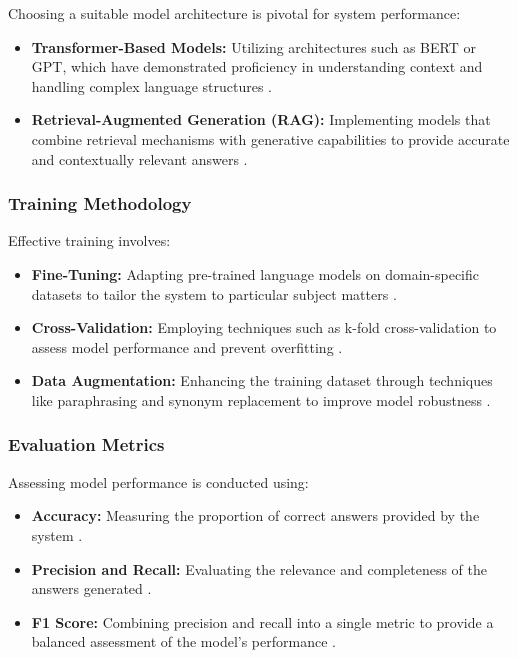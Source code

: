 \documentclass[sigconf]{acmart}
\begin{document}
Choosing a suitable model architecture is pivotal for system performance:

\begin{itemize}
    \item \textbf{Transformer-Based Models:} Utilizing architectures such as BERT or GPT, which have demonstrated proficiency in understanding context and handling complex language structures \cite{turn0search9}.
    \item \textbf{Retrieval-Augmented Generation (RAG):} Implementing models that combine retrieval mechanisms with generative capabilities to provide accurate and contextually relevant answers \cite{turn0search11}.
\end{itemize}

\subsubsection{Training Methodology}

Effective training involves:

\begin{itemize}
    \item \textbf{Fine-Tuning:} Adapting pre-trained language models on domain-specific datasets to tailor the system to particular subject matters \cite{turn0search7}.
    \item \textbf{Cross-Validation:} Employing techniques such as k-fold cross-validation to assess model performance and prevent overfitting \cite{turn0search6}.
    \item \textbf{Data Augmentation:} Enhancing the training dataset through techniques like paraphrasing and synonym replacement to improve model robustness \cite{turn0search0}.
\end{itemize}

\subsubsection{Evaluation Metrics}

Assessing model performance is conducted using:

\begin{itemize}
    \item \textbf{Accuracy:} Measuring the proportion of correct answers provided by the system \cite{turn0search6}.
    \item \textbf{Precision and Recall:} Evaluating the relevance and completeness of the answers generated \cite{turn0search6}.
    \item \textbf{F1 Score:} Combining precision and recall into a single metric to provide a balanced assessment of the model's performance \cite{turn0search6}.
\end{itemize}
\end{document}
